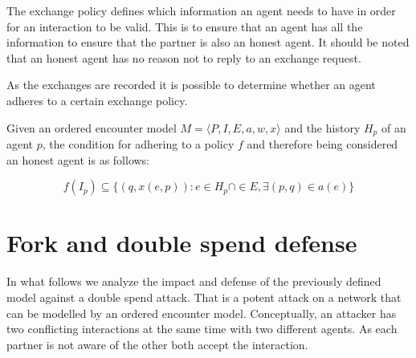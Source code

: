 The exchange policy defines which information an agent needs to have in order for an interaction to 
be valid. This is to ensure that an agent has all the information to ensure that the partner is also
an honest agent. It should be noted that an honest agent has no reason not to reply to an exchange 
request. 

As the exchanges are recorded it is possible to determine whether an agent adheres to a certain 
exchange policy. 

\begin{defn}
    Given an ordered encounter model $M = \langle P, I, E, a, w, x \rangle$ and the history $H_p$ of an
    agent $p$, the condition for adhering to a policy $f$ and
    therefore being considered an honest agent is as follows: 

    \begin{equation}
        f(I_p) \subseteq \{ (q, x(e, p)) : e \in H_p \cap \in E,  \exists (p, q) \in a(e)\}
    \end{equation}
\end{defn}






\section{Fork and double spend defense}
In what follows we analyze the impact and defense of the previously defined model against a double spend attack. That is a potent 
attack on a network that can be modelled by an ordered encounter model. Conceptually, an attacker 
has two conflicting interactions at the same time with two different agents. As each partner is not
aware of the other both accept the interaction. 

